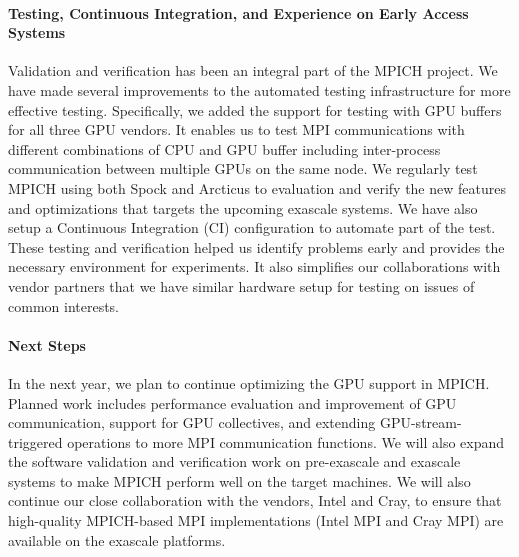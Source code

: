 \paragraph{Testing, Continuous Integration, and Experience on Early
Access Systems}

Validation and verification has been an integral part of the MPICH
project. We have made several improvements to the automated testing
infrastructure for more effective testing. Specifically, we added the
support for testing with GPU buffers for all three GPU vendors. It
enables us to test MPI communications with different combinations of CPU
and GPU buffer including inter-process communication between multiple
GPUs on the same node. We regularly test MPICH using both Spock and
Arcticus to evaluation and verify the new features and optimizations
that targets the upcoming exascale systems. We have also setup a
Continuous Integration (CI) configuration to automate part of the test.
These testing and verification helped us identify problems early and
provides the necessary environment for experiments. It also simplifies
our collaborations with vendor partners that we have similar hardware
setup for testing on issues of common interests.


\paragraph{Next Steps}
In the next year, we plan to continue optimizing the GPU support in
MPICH. Planned work includes performance evaluation and improvement of GPU
communication, support for GPU collectives, and  extending
GPU-stream-triggered operations to more MPI communication functions.
We will also expand the software validation and verification work on
pre-exascale and exascale systems to make MPICH perform well on the target
machines. We will also continue our close collaboration with the
vendors, Intel and Cray, to ensure that high-quality MPICH-based MPI implementations
(Intel MPI and Cray MPI) are available on the exascale platforms.
